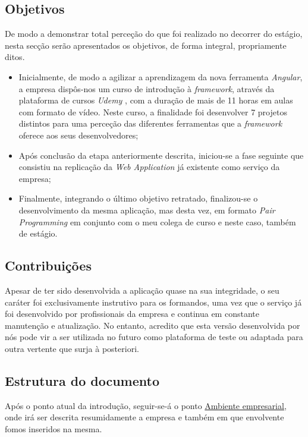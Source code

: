 \documentclass{article}
\begin{document}
\subsection{Objetivos}
\hspace{0.5cm} De modo a demonstrar total perceção do que foi realizado no decorrer do estágio, nesta secção serão apresentados os objetivos, de forma integral, propriamente ditos.
\begin{itemize}
  \item Inicialmente, de modo a agilizar a aprendizagem da nova ferramenta \emph{Angular}, a empresa dispôs-nos um curso de introdução à \emph{framework}, através da plataforma de cursos \emph{Udemy} \cite{udemy}, com a duração de mais de 11 horas em aulas com formato de vídeo. Neste curso, a finalidade foi desenvolver 7 projetos distintos para uma perceção das diferentes ferramentas que a \emph{framework} oferece aos seus desenvolvedores;
  \item Após conclusão da etapa anteriormente descrita, iniciou-se a fase seguinte que consistiu na replicação da \emph{Web Application} \cite{webapp} já existente como serviço da empresa;
  \item Finalmente, integrando o último objetivo retratado, finalizou-se o desenvolvimento da mesma aplicação, mas desta vez, em formato \emph{Pair Programming} \cite{pp} em conjunto com o meu colega de curso e neste caso, também de estágio.
\end{itemize}

\vspace*{0.125cm}

\subsection{Contribuições}
\label{sec:cont}
\hspace*{0.5cm} Apesar de ter sido desenvolvida a aplicação quase na sua integridade, o seu caráter foi exclusivamente instrutivo para os formandos, uma vez que o serviço já foi desenvolvido por profissionais da empresa e continua em constante manutenção e atualização. No entanto, acredito que esta versão desenvolvida por nós pode vir a ser utilizada no futuro como plataforma de teste ou adaptada para outra vertente que surja à posteriori. \newline

\subsection{Estrutura do documento}
\hspace*{0.5cm} Após o ponto atual da introdução, seguir-se-á o ponto \hyperref[sec:amb-emp]{Ambiente empresarial}, onde irá ser descrita resumidamente a empresa e também em que envolvente fomos inseridos na mesma.
\end{document}
